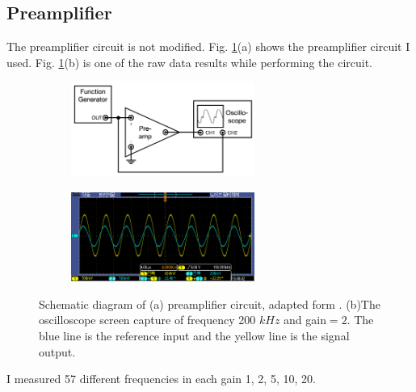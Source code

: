 \documentclass{article}
\begin{document}
\subsection{Preamplifier}
 The preamplifier circuit is not modified.
 Fig. \ref{fig: preamplifier_circuit}(a) shows the preamplifier circuit I used.
 Fig. \ref{fig: preamplifier_circuit}(b) is one of the raw data results while performing the circuit.

 \begin{figure}[ht]
  \centering
  \begin{subfigure}[b]{6cm}
      \centering
      \includegraphics[width=6cm]{../results/preamplifier_circuit.png}
      \caption{}
  \end{subfigure}
  \hfill
  \begin{subfigure}[b]{6cm}
      \centering
      \includegraphics[width=6cm]{../raw_data/TEK00071.PNG}
      \caption{}
  \end{subfigure}
  \hfill
  \caption{Schematic diagram of (a) preamplifier circuit, adapted form  \cite{signal_processor}.
  (b)The oscilloscope screen capture of frequency 200 $kHz$ and gain$=2$.
  The blue line is the reference input and the yellow line is the signal output.}
  \label{fig: preamplifier_circuit}
\end{figure}
 I measured 57 different frequencies in each gain 1, 2, 5, 10, 20.
\end{document}
